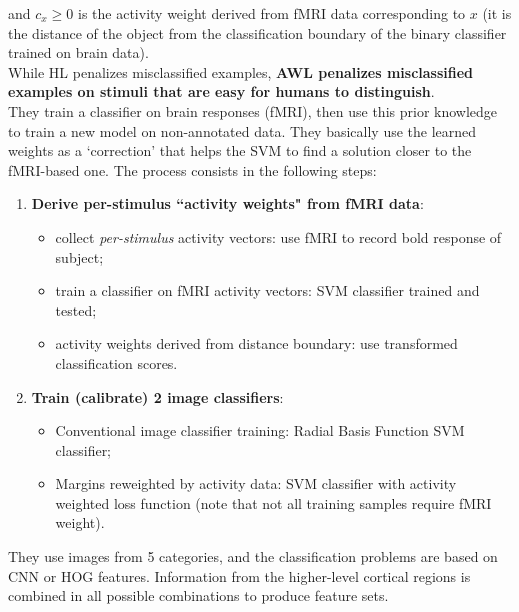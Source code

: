 and $c_x \geq 0$ is the activity weight derived from fMRI data corresponding to $x$ (it is the distance of the object from the classification boundary of the binary classifier trained on brain data).\\
While HL penalizes misclassified examples, \textbf{AWL penalizes misclassified examples on stimuli that are easy for humans to distinguish}.\\

They train a classifier on brain responses (fMRI), then use this prior knowledge to train a new model on non-annotated data. They basically use the learned weights as a `correction' that helps the SVM to find a solution closer to the fMRI-based one. The process consists in the following steps:
\begin{enumerate}
    \item \textbf{Derive per-stimulus ``activity weights" from fMRI data}:
        \begin{itemize}
        \item collect \textit{per-stimulus} activity vectors: use fMRI to record bold response of subject;
        \item train a classifier on fMRI activity vectors: SVM classifier trained and tested;
        \item activity weights derived from distance boundary: use transformed classification scores.
    \end{itemize}
    \item \textbf{Train (calibrate) 2 image classifiers}:
    \begin{itemize}
        \item Conventional image classifier training: Radial Basis Function SVM classifier;
        \item Margins reweighted by activity data: SVM classifier with activity weighted loss function (note that not all training samples require fMRI weight).
    \end{itemize}
\end{enumerate}

They use images from 5 categories, and the classification problems are based on CNN or HOG features. Information from the higher-level cortical regions is combined in all possible combinations to produce feature sets.

